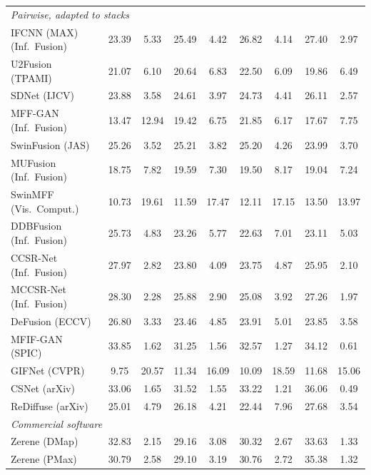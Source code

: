 \begin{table}[!htbp]
\begin{tabular}{lcccccccc}
\midrule
\multicolumn{9}{l}{\textit{Pairwise, adapted to stacks}} \\
IFCNN (MAX) (Inf.\ Fusion)~\cite{zhang2020ifcnn} & 23.39 & 5.33 & 25.49 & 4.42 & 26.82 & 4.14 & 27.40 & 2.97 \\
U2Fusion (TPAMI)~\cite{xu2020u2fusion} & 21.07 & 6.10 & 20.64 & 6.83 & 22.50 & 6.09 & 19.86 & 6.49 \\
SDNet (IJCV)~\cite{zhang2021sdnet} & 23.88 & 3.58 & 24.61 & 3.97 & 24.73 & 4.41 & 26.11 & 2.57 \\
MFF-GAN (Inf.\ Fusion)~\cite{zhang2021mff} & 13.47 & 12.94 & 19.42 & 6.75 & 21.85 & 6.17 & 17.67 & 7.75 \\
SwinFusion (JAS)~\cite{ma2022swinfusion} & 25.26 & 3.52 & 25.21 & 3.82 & 25.20 & 4.26 & 23.99 & 3.70 \\
MUFusion (Inf.\ Fusion)~\cite{cheng2023mufusion} & 18.75 & 7.82 & 19.59 & 7.30 & 19.50 & 8.17 & 19.04 & 7.24 \\
SwinMFF (Vis.\ Comput.)~\cite{xie2024swinmff} & 10.73 & 19.61 & 11.59 & 17.47 & 12.11 & 17.15 & 13.50 & 13.97 \\
DDBFusion (Inf.\ Fusion)~\cite{zhang2025ddbfusion} & 25.73 & 4.83 & 23.26 & 5.77 & 22.63 & 7.01 & 23.11 & 5.03 \\
CCSR-Net (Inf.\ Fusion)~\cite{ZHENG2025102974} & 27.97 & 2.82 & 23.80 & 4.09 & 23.75 & 4.87 & 25.95 & 2.10 \\
MCCSR-Net (Inf.\ Fusion)~\cite{ZHENG2025102974} & 28.30 & 2.28 & 25.88 & 2.90 & 25.08 & 3.92 & 27.26 & 1.97 \\
DeFusion (ECCV)~\cite{liang2022defusion} & 26.80 & 3.33 & 23.46 & 4.85 & 23.91 & 5.01 & 23.85 & 3.58 \\
MFIF-GAN (SPIC)~\cite{wang2021mfifgan} & 33.85 & 1.62 & 31.25 & 1.56 & 32.57 & 1.27 & 34.12 & 0.61 \\
GIFNet (CVPR)~\cite{cheng2025gifnet} & 9.75 & 20.57 & 11.34 & 16.09 & 10.09 & 18.59 & 11.68 & 15.06 \\
CSNet (arXiv)~\cite{csnet2026} & 33.06 & 1.65 & 31.52 & 1.55 & 33.22 & 1.21 & 36.06 & 0.49 \\
ReDiffuse (arXiv)~\cite{rediffuse2026} & 25.01 & 4.79 & 26.18 & 4.21 & 22.44 & 7.96 & 27.68 & 3.54 \\
\midrule
\multicolumn{9}{l}{\textit{Commercial software}} \\
Zerene (DMap) & 32.83 & 2.15 & 29.16 & 3.08 & 30.32 & 2.67 & 33.63 & 1.33 \\
Zerene (PMax) & 30.79 & 2.58 & 29.10 & 3.19 & 30.76 & 2.72 & 35.38 & 1.32 \\

\end{tabular}
\end{table}
